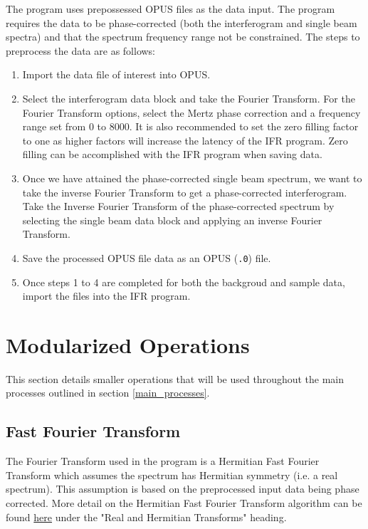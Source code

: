 \documentclass[a4paper, 12pt]{report}
\begin{document}
    The program uses prepossessed OPUS files as the data input. The program requires the data to be phase-corrected (both the interferogram and single beam spectra) and that the spectrum frequency range not be constrained. The steps to preprocess the data are as follows:
    
    \begin{enumerate}
        \item Import the data file of interest into OPUS.
        \item Select the interferogram data block and take the Fourier Transform. For the Fourier Transform options, select the Mertz phase correction and a frequency range set from 0 to 8000. It is also recommended to set the zero filling factor to one as higher factors will increase the latency of the IFR program. Zero filling can be accomplished with the IFR program when saving data.
        \item Once we have attained the phase-corrected single beam spectrum, we want to take the inverse Fourier Transform to get a phase-corrected interferogram. Take the Inverse Fourier Transform of the phase-corrected spectrum by selecting the single beam data block and applying an inverse Fourier Transform.
        \item Save the processed OPUS file data as an OPUS (\verb|.0|) file.
        \item Once steps 1 to 4 are completed for both the backgroud and sample data, import the files into the IFR program.
    \end{enumerate}
    
    \section{Modularized Operations}
    
    This section details smaller operations that will be used throughout the main processes outlined in section \ref{main_processes}.
    
    \subsection{Fast Fourier Transform}\label{fourier_transform}
    
    The Fourier Transform used in the program is a Hermitian Fast Fourier Transform which assumes the spectrum has Hermitian symmetry (i.e. a real spectrum). This assumption is based on the preprocessed input data being phase corrected. More detail on the Hermitian Fast Fourier Transform algorithm can be found \href{https://docs.scipy.org/doc/numpy-1.4.x/reference/routines.fft.html}{here} under the "Real and Hermitian Transforms" heading.
    
\end{document}
